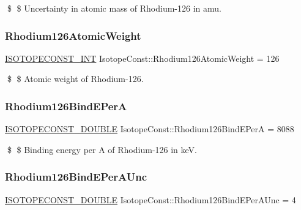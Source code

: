 \$ \$ Uncertainty in atomic mass of Rhodium-\/126 in amu. \mbox{\label{group___isotope_const-_rhodium-_rh126_ga3cedb57de1af13f3abf3233e9fdbeefc}} 
\subsubsection{\texorpdfstring{Rhodium126\+Atomic\+Weight}{Rhodium126AtomicWeight}}
{\footnotesize\ttfamily \mbox{\hyperlink{group___isotope_const-_macros_ga5f18360b3e99483a35c32d789e62621c}{I\+S\+O\+T\+O\+P\+E\+C\+O\+N\+S\+T\+\_\+\+I\+NT}} Isotope\+Const\+::\+Rhodium126\+Atomic\+Weight = 126}

\$ \$ Atomic weight of Rhodium-\/126. \mbox{\label{group___isotope_const-_rhodium-_rh126_gabf6b7a7ddec91398e8215dab1916f90a}} 
\subsubsection{\texorpdfstring{Rhodium126\+Bind\+E\+PerA}{Rhodium126BindEPerA}}
{\footnotesize\ttfamily \mbox{\hyperlink{group___isotope_const-_macros_ga8f45a7272ce02c0b4c65c44636ed719a}{I\+S\+O\+T\+O\+P\+E\+C\+O\+N\+S\+T\+\_\+\+D\+O\+U\+B\+LE}} Isotope\+Const\+::\+Rhodium126\+Bind\+E\+PerA = 8088}

\$ \$ Binding energy per A of Rhodium-\/126 in keV. \mbox{\label{group___isotope_const-_rhodium-_rh126_ga840be42bac9445be971df86585ab584f}} 
\subsubsection{\texorpdfstring{Rhodium126\+Bind\+E\+Per\+A\+Unc}{Rhodium126BindEPerAUnc}}
{\footnotesize\ttfamily \mbox{\hyperlink{group___isotope_const-_macros_ga8f45a7272ce02c0b4c65c44636ed719a}{I\+S\+O\+T\+O\+P\+E\+C\+O\+N\+S\+T\+\_\+\+D\+O\+U\+B\+LE}} Isotope\+Const\+::\+Rhodium126\+Bind\+E\+Per\+A\+Unc = 4}

